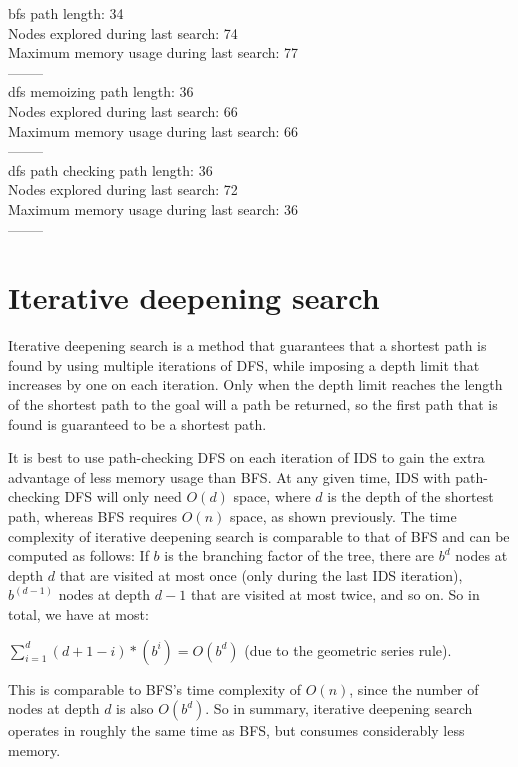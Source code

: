\documentclass{article}
\begin{document}
{\setlength{\parindent}{0cm}
bfs path length:  34\\
Nodes explored during last search: 74\\
Maximum memory usage during last search: 77\\
--------\\
dfs memoizing path length: 36\\
Nodes explored during last search: 66\\
Maximum memory usage during last search: 66\\
--------\\
dfs path checking path length: 36\\
Nodes explored during last search: 72\\
Maximum memory usage during last search: 36\\
--------}\\

\section{Iterative deepening search}

Iterative deepening search is a method that guarantees that a shortest path is found by using multiple iterations of DFS, while imposing a depth limit that increases by one on each iteration. Only when the depth limit reaches the length of the shortest path to the goal will a path be returned, so the first path that is found is guaranteed to be a shortest path.

It is best to use path-checking DFS on each iteration of IDS to gain the extra advantage of less memory usage than BFS. At any given time, IDS with path-checking DFS will only need $O(d)$ space, where $d$ is the depth of the shortest path, whereas BFS requires $O(n)$ space, as shown previously. The time complexity of iterative deepening search is comparable to that of BFS and can be computed as follows: If $b$ is the branching factor of the tree, there are $b^d$ nodes at depth $d$ that are visited at most once (only during the last IDS iteration), $b^(d-1)$ nodes at depth $d - 1$ that are visited at most twice, and so on. So in total, we have at most:

\vspace{5mm}

$\sum\limits_{i=1}^d (d+1-i)*(b^i) = O(b^d)$ (due to the geometric series rule). 

\vspace{5mm}

This is comparable to BFS's time complexity of $O(n)$, since the number of nodes at depth $d$ is also $O(b^d)$. So in summary, iterative deepening search operates in roughly the same time as BFS, but consumes considerably less memory.
\end{document}
